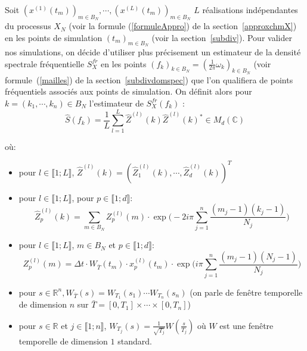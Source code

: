 Soit $(x^{(1)}(t_m))_{m \in B_N}, \cdots, (x^{(L)}(t_m))_{m \in B_N} $ $L$ réalisations indépendantes du
processus $X_N$ (voir la formule (\ref{formuleAppro}) de la section~\ref{approxchmX}) en les points de simulation $(t_m)_{m \in B_N}$ (voir
la section~\ref{subdiv}). Pour valider nos simulations, on décide d'utiliser plus précisement un estimateur de la densité spectrale fréquentielle $S_X^{fr}$ en les
points $(f_k)_{k \in B_N}=(\frac{1}{2\pi}\omega_k)_{k \in B_N}$ (voir formule~(\ref{mailles}) de la section~\ref{subdivdomspec}) que l'on qualifiera de points fréquentiels associés aux points de simulation.
On définit alors pour $k = (k_1, \cdots, k_n) \in B_N$ l'estimateur de $S_X^{fr}(f_k)$ :
\begin{equation}
\hat{S}(f_k) = \frac{1}{L} \displaystyle\sum_{l = 1}^{L} \hat{Z}^{(l)}(k)\hat{Z}^{(l)}(k)^{*} \in M_d(\mathbb{C})  
\end{equation}

où:

\begin{itemize}

\item pour $l \in \llbracket 1;L \rrbracket$, $\hat{Z}^{(l)}(k) = (\hat{Z}^{(l)}_{1}(k), \cdots, \hat{Z}^{(l)}_{d}(k))^{T}$\\
  
\item pour $l \in \llbracket 1;L \rrbracket$, pour $p \in \llbracket 1;d \rrbracket$:
  \begin{equation*} \hat{Z}^{(l)}_{p}(k) = \displaystyle\sum_{m \in B_N} Z_{p}^{(l)}(m)\cdot\exp \biggl(-2i\pi \displaystyle\sum_{j = 1}^{n} \frac{(m_j -1)(k_j -1)}{N_j} \biggr)  \end{equation*}

\item pour $l \in \llbracket 1;L \rrbracket$, $m \in B_N $ et  $p \in \llbracket 1;d \rrbracket$:
  \begin{equation*} Z^{(l)}_{p}(m) = \Delta t \cdot W_{\bar{T}}(t_m) \cdot x^{(l)}_{p}(t_m) \cdot \exp \biggl (i\pi \displaystyle\sum_{j = 1}^{n} \frac{(m_j -1)(N_j -1)}{N_j} \biggr)  \end{equation*}

\item pour $s \in \mathbb{R}^{n}, W_{\bar{T}}(s) = W_{T_1}(s_1) \cdots W_{T_n}(s_n)$ (on parle de fenêtre temporelle de dimension $n$ sur $\bar{T} = [0,T_1] \times \cdots \times [0,T_n]$) \\

\item pour $s \in \mathbb{R}$ et $j \in \llbracket 1;n \rrbracket$, $W_{T_j}(s) = \frac{1}{\sqrt{T_j}} W(\frac{s}{T_j})$ où
$W$ est une fenêtre temporelle de dimension $1$ standard.
\end{itemize}

